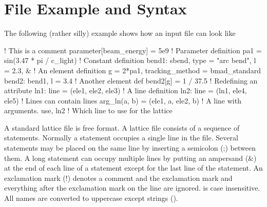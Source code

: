\section{File Example and Syntax}

The following (rather silly) example shows how an input file can look like
\begin{example}
  ! This is a comment
  parameter[beam_energy] = 5e9                   ! Parameter definition
  pa1 = sin(3.47 * pi / c_light)                 ! Constant definition
  bend1: sbend, type = "arc bend", l = 2.3, &    ! An element definition
      g = 2*pa1, tracking_method = bmad_standard
  bend2: bend1, l = 3.4                          ! Another element def
  bend2[g] = 1 / 37.5                            ! Redefining an attribute
  ln1: line = (ele1, ele2, ele3)                 ! A line definition
  ln2: line = (ln1, ele4, ele5)                  ! Lines can contain lines
  arg_ln(a, b) = (ele1, a, ele2, b)              ! A line with arguments.
  use, ln2                                       ! Which line to use for the lattice
\end{example}

A \bmad standard lattice file is free format. A \bmad lattice file consists
of a sequence of statements. Normally a statement occupies a single
line in the file. Several statements may be placed on the same line by
inserting a semicolon (;) between them. A long statement can occupy
multiple lines by putting an ampersand (\&) at the end of each line of
a statement except for the last line of the statement. An
exclamation mark (!) denotes a comment and the exclamation mark and
everything after the exclamation mark on the line are ignored. 
\bmad is case insensitive. All names are converted to uppercase except
strings ().

